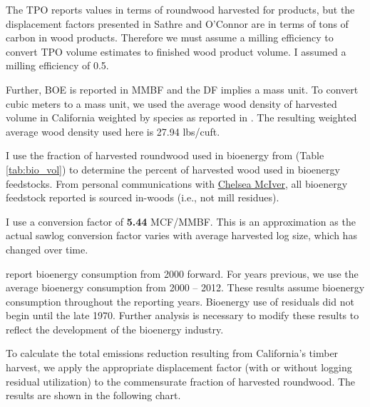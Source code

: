 \documentclass[a4paper,titlepage]{article}
\begin{document}
The TPO reports values in terms of roundwood harvested for products, but the
displacement factors presented in Sathre and O'Connor are in terms of
tons of carbon in wood products. Therefore we must assume a milling
efficiency to convert TPO volume estimates to finished wood product volume. I assumed a milling efficiency of 0.5.


Further, \ac{BOE} is reported in MMBF and the DF implies a mass
unit. To convert cubic meters to a mass unit, we used the average wood
density of harvested volume in California weighted by species as reported 
in \citet{Mciver2012}. The resulting weighted average wood density used here is 27.94 lbs/cuft.


I use the fraction of harvested roundwood used in bioenergy from \cite{Mciver2012} (Table \ref{tab:bio_vol})  to determine the percent of harvested wood used in bioenergy feedstocks. From personal communications with
\href{http://www.bber.umt.edu/staff/mciver.asp}{Chelsea McIver}, all bioenergy feedstock reported is sourced in-woods (i.e., not mill residues). 

I use a conversion factor of \textbf{5.44} MCF/MMBF. This is an approximation as the
actual sawlog conversion factor varies with average harvested log size, which has changed over time.  

 \citeauthor{Mciver2012} report bioenergy consumption from 2000
forward. For years previous, we use the average bioenergy consumption
from 2000 -- 2012. These results assume bioenergy consumption
throughout the reporting years. Bioenergy use of residuals did not
begin until the late 1970. Further analysis is necessary to modify
these results to reflect the development of the bioenergy industry.

To calculate the total emissions reduction resulting from California's
timber harvest, we apply the appropriate displacement factor (with or
without logging residual utilization) to the commensurate fraction of
harvested roundwood. The results are shown in the following chart.
\end{document}
